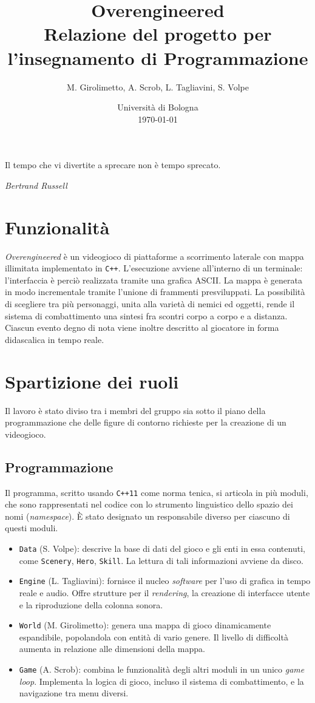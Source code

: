 \documentclass[a4paper]{article}
\title{Overengineered \\
\large Relazione del progetto per l'insegnamento di Programmazione}
\author{
  M. Girolimetto,
  A. Scrob,
  L. Tagliavini,
  S. Volpe
}
\date{
	Universit\`a di Bologna \\
  \today
}
\begin{document}
\maketitle

\epigraph{Il tempo che vi divertite a sprecare non è tempo sprecato.}
{\textit{Bertrand Russell}}

\section{Funzionalit\`a}

\emph{Overengineered} \`e un videogioco di piattaforme a scorrimento laterale
con mappa illimitata implementato in \verb!C++!. L'esecuzione avviene
all'interno di un terminale: l'interfaccia \`e perci\`o realizzata tramite una
grafica ASCII. La mappa \`e generata in modo incrementale tramite l'unione di
frammenti presviluppati. La possibilit\`a di scegliere tra pi\`u personaggi,
unita alla variet\`a di nemici ed oggetti, rende il sistema di combattimento una
sintesi fra scontri corpo a corpo e a distanza. Ciascun evento degno di nota
viene inoltre descritto al giocatore in forma didascalica in tempo reale.

\section{Spartizione dei ruoli}

Il lavoro \`e stato diviso tra i membri del gruppo sia sotto il piano della
programmazione che delle figure di contorno richieste per la creazione di un
videogioco.

\subsection{Programmazione}

Il programma, scritto usando \verb!C++11! come norma tenica, si articola in
pi\`u moduli, che sono rappresentati nel codice con lo strumento linguistico
dello spazio dei nomi (\emph{namespace}). \`E stato designato un responsabile
diverso per ciascuno di questi moduli.
\begin{itemize}
  \item \verb!Data! (S. Volpe): descrive la base di dati del gioco e gli enti in
    essa contenuti, come \verb!Scenery!, \verb!Hero!, \verb!Skill!. La lettura
    di tali informazioni avviene da disco.
  \item \verb!Engine! (L. Tagliavini): fornisce il nucleo \emph{software} per
    l'uso di grafica in tempo reale e audio. Offre strutture per il
    \emph{rendering}, la creazione di interfacce utente e la riproduzione della
    colonna sonora.
  \item \verb!World! (M. Girolimetto): genera una mappa di gioco dinamicamente
    espandibile, popolandola con entit\`a di vario genere. Il livello di
    difficolt\`a aumenta in relazione alle dimensioni della mappa.
  \item \verb!Game! (A. Scrob): combina le funzionalit\`a degli altri moduli in
    un unico \emph{game loop}. Implementa la logica di gioco, incluso il sistema
    di combattimento, e la navigazione tra menu diversi.
\end{itemize}
\end{document}
